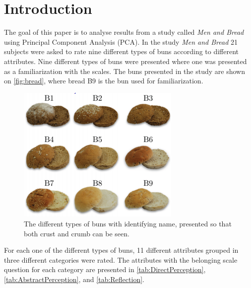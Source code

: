 \chapter*{Introduction}
\label{introduction}
%
The goal of this paper is to analyse results from a study called \textit{Men and Bread} using Principal Component Analysis (PCA). \blankline
% 
In the study \textit{Men and Bread} 21 subjects were asked to rate nine different types of buns according to different attributes. Nine different types of buns were presented where one was presented as a familiarization with the scales. The buns presented in the study are shown on \autoref{fig:bread}, where bread B9 is the bun used for familiarization. 
%
\begin{figure}[H]
\centering
\includegraphics[width =0.7\textwidth]{Figure/Bread}
\caption{The different types of buns with identifying name, presented so that both crust and crumb can be seen.}
\label{fig:bread}
\end{figure}
\noindent
%
For each one of the different types of buns, 11 different attributes grouped in three different categories were rated. The attributes with the belonging scale question for each category are presented in \autoref{tab:DirectPerception}, \autoref{tab:AbstractPerception}, and \autoref{tab:Reflection}.
%
